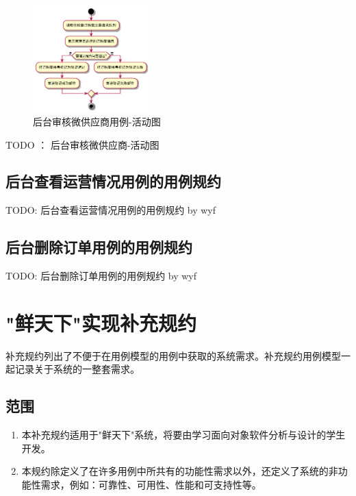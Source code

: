 \begin{figure}[htp]
    \centering
    \includegraphics[width=0.4\textwidth]{figure/usecase/uc_sub/uc_admin_check_client.png}
    \caption{后台审核微供应商用例-活动图}
    \label{fig:shenhe-order-uml}
\end{figure}
TODO ： 后台审核微供应商-活动图


\subsection{后台查看运营情况用例的用例规约}

TODO: 后台查看运营情况用例的用例规约  by wyf

\subsection{后台删除订单用例的用例规约}

TODO: 后台删除订单用例的用例规约  by wyf



\section{"鲜天下"实现补充规约}
    补充规约列出了不便于在用例模型的用例中获取的系统需求。补充规约用例模型一起记录关于系统的一整套需求。


\subsection{范围}
    \begin{enumerate}

        \item 本补充规约适用于"鲜天下"系统，将要由学习面向对象软件分析与设计的学生开发。
        \item 本规约除定义了在许多用例中所共有的功能性需求以外，还定义了系统的非功能性需求，例如：可靠性、可用性、性能和可支持性等。

    \end{enumerate}

